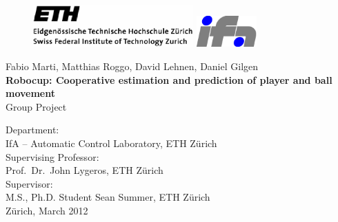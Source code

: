 \begin{titlepage}
	\begin{center}
	
	\begin{figure}[!ht]
	\begin{center}
	\centerline{ \includegraphics[height=16mm]{./Pictures/ethz_logo}
	              \hspace{25mm}
		    \includegraphics[height=12mm]{./Pictures/ifalogo_color}}
	\end{center}
	\end{figure}
	
	\vspace*{20mm}
	
	{Fabio Marti},
	{Matthias Roggo},
	{David Lehnen},
	{Daniel Gilgen}\\
	
	\vspace{10mm} {\LARGE \bf Robocup: Cooperative estimation and prediction of player and ball movement \\} \vspace{10mm}
	{Group Project} \\
	
	\vspace{50mm}
	
	Department: \\
	IfA -- Automatic Control Laboratory, ETH Z\"urich \\
	
	\vspace{5mm}
	Supervising Professor: \\
	Prof.~Dr.~John Lygeros, ETH Z\"urich \\
	
	\vspace{5mm}
	Supervisor: \\
	M.S., Ph.D. Student Sean Summer, ETH Z\"urich \\
	
	\vspace{10mm}
	Z\"urich, March 2012
	
	\end{center}
\end{titlepage}

